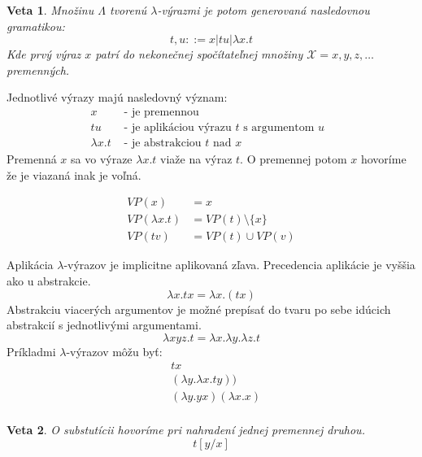 \documentclass[a4paper,10pt,oneside]{report}%
\newtheorem{theorem}{Veta}[chapter]
\begin{document}
\begin{theorem}
    Množinu $\Lambda$ tvorenú $\lambda$-výrazmi je potom generovaná nasledovnou gramatikou:
    \begin{equation}
        t, u ::= x | t u | \lambda x.t
    \end{equation}
    Kde prvý výraz $x$ patrí do nekonečnej spočítateľnej množiny $\mathcal{X}={x,y,z,\dots}$
premenných.
\end{theorem}
    Jednotlivé výrazy majú nasledovný význam:
\begin{align*}
     x          & \textrm{ - je premennou }\\
     t u        & \textrm{ - je aplikáciou výrazu $t$ s argumentom $u$ }\\
    \lambda x.t & \textrm{ - je abstrakciou $t$ nad $x$ }
\end{align*}
    Premenná $x$ sa vo výraze $\lambda x . t$ viaže na výraz $t$. O premennej potom
$x$ hovoríme že je viazaná inak je voľná.

\begin{center}
    \begin{align*}
        VP(x) &= {x} \\
        VP(\lambda x.t) &= VP(t)  \setminus \{x\} \\
        VP(t v) &= VP(t) \cup VP(v)
    \end{align*}
\end{center}
    Aplikácia $\lambda$-výrazov je implicitne aplikovaná zľava.
    Precedencia aplikácie je vyššia ako u abstrakcie.
\begin{equation*}
    \lambda x . t x = \lambda x . (t x)
\end{equation*}
    Abstrakciu viacerých argumentov je možné prepísať do tvaru po sebe idúcich
abstrakcií s jednotlivými argumentami.
\begin{equation*}
    \lambda x y z . t = \lambda x . \lambda y . \lambda z . t
\end{equation*}
    Príkladmi $\lambda$-výrazov môžu byť:
\begin{align*}
    & t x                             \\
    & (\lambda y . \lambda x . t y )) \\
    & (\lambda y.y x) (\lambda x . x) \\
\end{align*}
\begin{theorem}
    O substutícii hovoríme pri nahradení jednej premennej druhou.
    \begin{equation}
        t [ y / x ]
    \end{equation}
\end{theorem}
\end{document}
